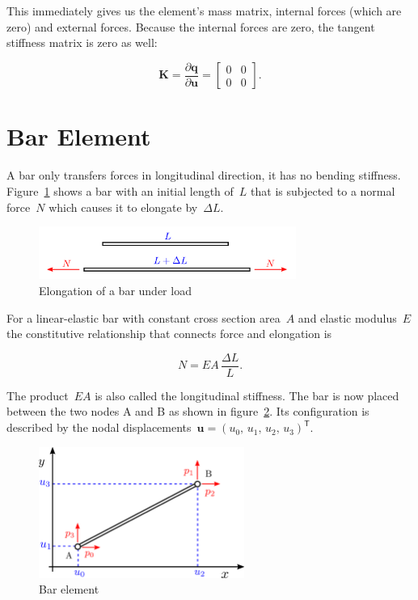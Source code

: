 This immediately gives us the element's mass matrix, internal forces (which are zero) and external forces.
Because the internal forces are zero, the tangent stiffness matrix is zero as well:

\begin{equation}
\boldsymbol{K} = \frac{\partial \boldsymbol{q}}{\partial \boldsymbol{u}} =
\begin{bmatrix}
0 & 0\\
0 & 0
\end{bmatrix}.
\end{equation}

\newpage
\section{Bar Element}

A bar only transfers forces in longitudinal direction, it has no bending stiffness. Figure~\ref{fig:bar-element-1} shows a bar with an initial length of~$L$ that is subjected to a normal force~$N$ which causes it to elongate by~$\Delta L$.

\begin{figure}[h]
\centering
\includegraphics[width=0.75\textwidth]{figures/elements/bar-element-1}
\caption{Elongation of a bar under load}
\label{fig:bar-element-1}
\end{figure}

For a linear-elastic bar with constant cross section area~$A$ and elastic modulus~$E$ the constitutive relationship that connects force and elongation is

\begin{equation}
N = EA\,\frac{\Delta L}{L}.\label{eq:bar-constitutive}
\end{equation}

The product~$EA$ is also called the longitudinal stiffness. The bar is now placed between the two nodes A and B as shown in figure~\ref{fig:bar-element-2}. Its configuration is described by the nodal displacements~$\boldsymbol{u} = (u_0,\,u_1,\,u_2,\,u_3)^\mathsf{T}$.

\begin{figure}[h]
\centering
\includegraphics[width=0.6\textwidth]{figures/elements/bar-element-2}
\caption{Bar element}
\label{fig:bar-element-2}
\end{figure}

